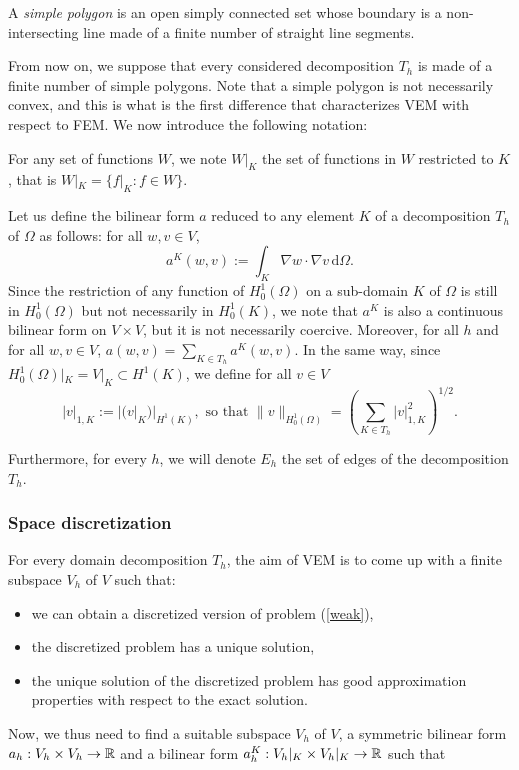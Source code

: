 \begin{definition}
A \textit{simple polygon} is an open simply connected set whose boundary is a non-intersecting line made of a finite number of straight line segments. 
\end{definition}

\noindent From now on, we suppose that every considered decomposition $T_h$ is made of a finite number of simple polygons. Note that a simple polygon is not necessarily convex, and this is what is the first difference that characterizes VEM with respect to FEM. We now introduce the following notation: 
\begin{notation}
For any set of functions $W$, we note $W|_K$ the set of functions in $W$ restricted to $K$, that is $W|_K = \{f|_K : f\in W\}$. 
\end{notation}

\noindent Let us define the bilinear form $a$ reduced to any element $K$ of a decomposition $T_h$ of $\Omega$ as follows: for all $w,v\in V$,
$$ a^K(w,v) := \int_K \nabla w \cdot \nabla v \, \mathrm{d}\Omega. $$
Since the restriction of any function of $H_0^1(\Omega)$ on a sub-domain $K$ of $\Omega$ is still in $H_0^1(\Omega)$ but not necessarily in $H_0^1(K)$, we note that $a^K$ is also a continuous bilinear form on $V\times V$, but it is not necessarily coercive. Moreover, for all $h$ and for all $w,v\in V$, $a(w,v) = \sum_{K\in T_h} a^K(w,v)$. In the same way, since $H_0^1(\Omega)|_K = V|_K \subset H^1(K)$, we define for all $v\in V$
$$ |v|_{1, K} := |(v|_K)|_{H^1(K)}, \text{ so that } \|v\|_{H_0^1(\Omega)} = \left(\sum_{K\in T_h} |v|_{1,K}^2\right)^{1/2}.$$

\noindent Furthermore, for every $h$, we will denote $E_h$ the set of edges of the decomposition $T_h$. 

\subsubsection{Space discretization}
For every domain decomposition $T_h$, the aim of VEM is to come up with a finite subspace $V_h$ of $V$ such that:
\begin{itemize}
\item we can obtain a discretized version of problem (\ref{weak}),
\item the discretized problem has a unique solution,
\item the unique solution of the discretized problem has good approximation properties with respect to the exact solution. 
\end{itemize}

Now, we thus need to find a suitable subspace $V_h$ of $V$, a symmetric bilinear form $a_h : V_h\times V_h \rightarrow \mathbb{R}$ and a bilinear form $a_h^K:V_h|_K \times V_h|_K \rightarrow \mathbb{R}$ such that 